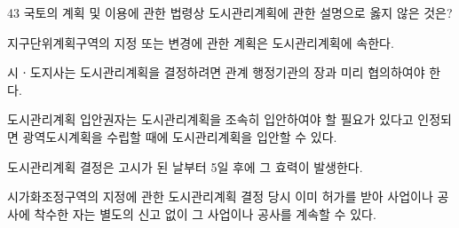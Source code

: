 \begin{question}{43}
국토의 계획 및 이용에 관한 법령상 도시관리계획에 관한 설명으로 옳지 않은 것은?
\begin{choices}
  \item 지구단위계획구역의 지정 또는 변경에 관한 계획은 도시관리계획에 속한다.
  \item 시ㆍ도지사는 도시관리계획을 결정하려면 관계 행정기관의 장과 미리 협의하여야 한다.
  \item 도시관리계획 입안권자는 도시관리계획을 조속히 입안하여야 할 필요가 있다고 인정되면 광역도시계획을 수립할 때에 도시관리계획을 입안할 수 있다.
  \item 도시관리계획 결정은 고시가 된 날부터 5일 후에 그 효력이 발생한다.
  \item 시가화조정구역의 지정에 관한 도시관리계획 결정 당시 이미 허가를 받아 사업이나 공사에 착수한 자는 별도의 신고 없이 그 사업이나 공사를 계속할 수 있다.
\end{choices}
\end{question}
